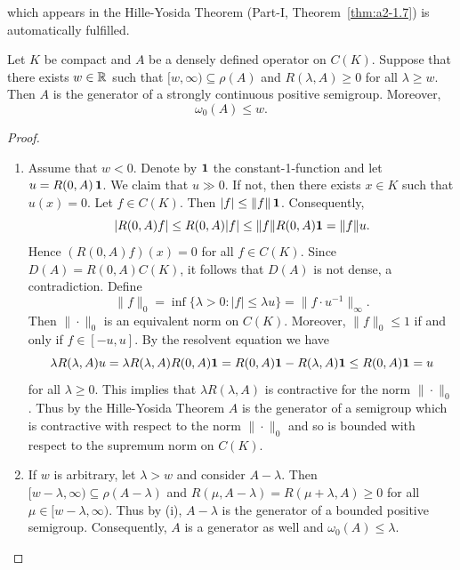 which appears in the Hille-Yosida Theorem (Part-I, Theorem~\ref{thm:a2-1.7}) is automatically fulfilled.
\begin{theorem}\label{thm:b2-1.8}
Let $K$ be compact and $A$ be a densely defined operator on $C(K)$.
Suppose that there exists $w \in \mathbb{R}$ such that $[w,\infty) \subseteq \rho(A)$ and $R(\lambda,A) \geq 0$ for all $\lambda \geq w$.
Then $A$ is the generator of a strongly continuous positive semigroup.
Moreover,
\begin{equation}\label{eq:b2-1.3}
    \omega_{0}(A) \leq w.
\end{equation}
\end{theorem}
\begin{proof} 
\begin{enumerate}[\upshape (i), wide, labelindent=.25em]
\item \label{thm:b2-1.8-1}
Assume that $w < 0$.
Denote by $\mathbf{1}$ the constant-1-function and let $u = R(0,A)\,\mathbf{1}$.
We claim that $u \gg 0$.
If not, then there exists $x \in K$ such that $u(x) = 0$.
Let $f \in C(K)$.
Then $|f| \leq \|f\| \, \1$.
Consequently, 
%
\[
	\vert R(0,A)f \vert \leq R(0,A)|f| \leq \|f\|R(0,A)\1 = \|f\|u.
\]
%
Hence $(R(0,A)f)(x) = 0$ for all $f \in C(K)$.
Since $D(A) = R(0,A)C(K)$, it follows that $D(A)$ is not dense, a contradiction.
Define 
\[\|f\|_{0} = \inf \{\lambda > 0 \colon |f| \leq \lambda u\} = \|f \cdot u^{-1} \|_{\infty}.
\]
Then $\|\cdot\|_{0}$ is an equivalent norm on $C(K)$.
Moreover, $\|f\|_{0} \leq 1$ if and only if\/ $f \in [-u,u]$.
By the resolvent equation we have 
\[
\lambda R(\lambda,A)u = \lambda R(\lambda,A)R(0,A)\1 = R(0,A)\1 - R(\lambda,A)\1 \leq R(0,A)\1 = u 
\]
for all $\lambda \geq 0$.
This implies that $\lambda R(\lambda,A)$ is contractive for the norm $\|\cdot\|_{0}$.
Thus by the Hille-Yosida Theorem $A$ is the generator of a semigroup which is contractive with respect to the norm $\|\cdot\|_{0}$ and so is bounded with respect to the supremum norm on $C(K)$.

\item \label{thm:b2-1.8-2}
If\/ $w$ is arbitrary, let $\lambda > w$ and consider $A - \lambda$.
Then $[w-\lambda,\infty) \subseteq \rho(A-\lambda)$ and $R(\mu,A-\lambda) = R(\mu+\lambda,A) \geq 0$ for all $\mu \in [w-\lambda,\infty)$.
Thus by (i), $A - \lambda$ is the generator of a bounded positive semigroup.
Consequently, $A$ is a generator as well and $\omega_{0}(A) \leq \lambda$.
\qedhere
\end{enumerate}
\end{proof}
